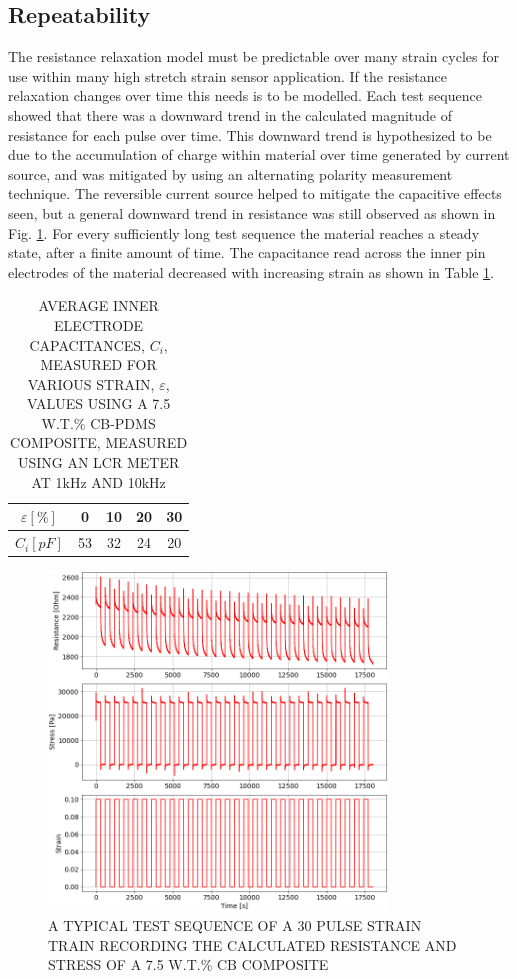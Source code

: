 \subsection*{Repeatability}
The resistance relaxation model must be predictable over many strain cycles for use within many high stretch strain sensor application. If the resistance relaxation changes over time this needs is to be modelled. Each test sequence showed that there was a downward trend in the calculated magnitude of resistance for each pulse over time. This downward trend is hypothesized to be due to the accumulation of charge within material over time generated by current source, and was mitigated by using an alternating polarity measurement technique. The reversible current source helped to mitigate the capacitive effects seen, but a general downward trend in resistance was still observed as shown in Fig. \ref{fig:repeatability_pulse_trains}.  For every sufficiently long test sequence the material reaches a steady state, after a finite amount of time. The capacitance read across the inner pin electrodes of the material decreased with increasing strain as shown in Table \ref{tab:capacitance_v_strain}.
\begin{table}[H]
	\centering
	\caption{AVERAGE INNER ELECTRODE CAPACITANCES, $C_i$, MEASURED FOR VARIOUS STRAIN, $\varepsilon$, VALUES USING A 7.5 W.T.\% CB-PDMS COMPOSITE, MEASURED USING AN LCR METER AT 1kHz AND 10kHz \newline}
	\label{tab:capacitance_v_strain}
	\begin{tabular}{c||cccc}
		$\varepsilon [\%]$ & 0 & 10 & 20 & 30 \\
		\hline
		$C_i [pF]$ & 53 & 32 & 24 & 20 \\
	\end{tabular}
\end{table}
\begin{figure}[h!]
	\centering
	\includegraphics[width=9cm]{Figures/30_pulse_AC_2-7-5_Epin_20mm_v3.png}
	\caption{A TYPICAL TEST SEQUENCE OF A 30 PULSE STRAIN TRAIN RECORDING THE CALCULATED RESISTANCE AND STRESS OF A 7.5 W.T.\% CB COMPOSITE}
	\label{fig:repeatability_pulse_trains}
\end{figure}
